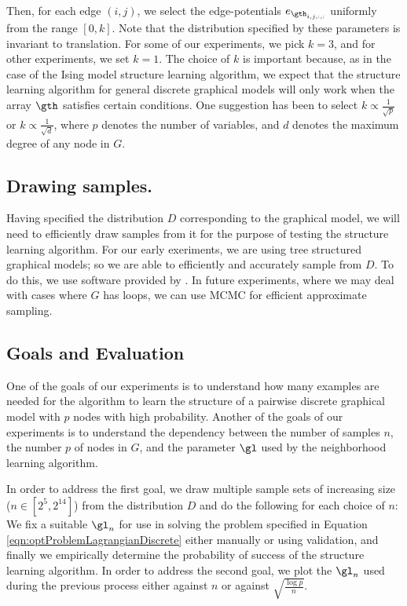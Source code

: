 \documentclass{article}
\begin{document}
Then, for each edge $(i, j)$, we select the edge-potentials $e_{\gth_{i, j, :, :}}$ uniformly from the range $[0, k]$. Note that the distribution specified by these parameters is invariant to translation. For some of our experiments, we pick $k=3$, and for other experiments, we set $k=1$. The choice of $k$ is important because, as in the case of the Ising model structure learning algorithm, we expect that the structure learning algorithm for general discrete graphical models will only work when the array $\gth$ satisfies certain conditions. One suggestion \citet{pradeepPrivate} has been to select $k \propto \frac{1}{\sqrt{p}}$ or $k \propto \frac{1}{\sqrt{d}}$, where $p$ denotes the number of variables, and $d$ denotes the maximum degree of any node in $G$.

\subsection{Drawing samples.}
Having specified the distribution $D$ corresponding to the graphical model, we will need to efficiently draw samples from it for the purpose of testing the structure learning algorithm. For our early exeriments, we are using tree structured graphical models; so we are able to efficiently and accurately sample from $D$. To do this, we use software provided by \citet{schmidtSoftware}. In future experiments, where we may deal with cases where $G$ has loops, we can use MCMC for efficient approximate sampling.

\subsection{Goals and Evaluation}
One of the goals of our experiments is to understand how many examples are needed for the algorithm to learn the structure of a pairwise discrete graphical model with $p$ nodes with high probability. Another of the goals of our experiments is to understand the dependency between the number of samples $n$, the number $p$ of nodes in $G$, and the parameter $\gl$ used by the neighborhood learning algorithm.

In order to address the first goal, we draw multiple sample sets of increasing size ($n \in [2^{5}, 2^{14}]$) from the distribution $D$ and do the following for each choice of $n$: We fix a suitable $\gl_n$ for use in solving the problem specified in Equation \ref{eqn:optProblemLagrangianDiscrete} either manually or using validation, and finally we empirically determine the probability of success of the structure learning algorithm. In order to address the second goal, we plot the $\gl_n$ used during the previous process either against $n$ or against $\sqrt{\frac{\log p}{n}}$.
\end{document}
